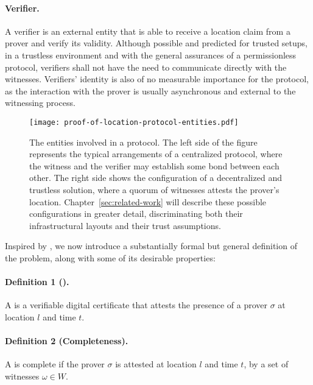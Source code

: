 \paragraph{Verifier.} A verifier is an external entity that is able to receive a location claim from a prover and verify its validity. Although possible and predicted for trusted setups, in a trustless environment and with the general assurances of a permissionless protocol, verifiers shall not have the need to communicate directly with the witnesses. Verifiers' identity is also of no measurable importance for the protocol, as the interaction with the prover is usually asynchronous and external to the witnessing process.

\begin{figure}[ht]
    \begin{center}
    \texttt{[image: proof-of-location-protocol-entities.pdf]}
    \caption{The entities involved in a \pol{} protocol. The left side of the figure represents the typical arrangements of a centralized protocol, where the witness and the verifier may establish some bond between each other. The right side shows the configuration of a decentralized and trustless solution, where a quorum of witnesses attests the prover's location. Chapter~\ref{sec:related-work} will describe these possible configurations in greater detail, discriminating both their infrastructural layouts and their trust assumptions.}
    \label{fig:proof-of-location-protocol-entities}
    \end{center}
\end{figure}

Inspired by \cite{nasrulin2018robust, dupin2018location}, we now introduce a substantially formal but general definition of the \pol{} problem, along with some of its desirable properties:

\paragraph{Definition 1 (\pol{}).} A \pol{} is a verifiable digital certificate that attests the presence of a prover $\sigma$ at location $l$ and time $t$.

\paragraph{Definition 2 (Completeness).} A \pol{} is complete if the prover $\sigma$ is attested at location $l$ and time $t$, by a set of witnesses $\omega \in W$.

